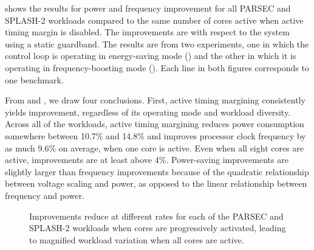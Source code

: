  shows the results for power and frequency improvement for all PARSEC and SPLASH-2 workloads compared to the same number of cores active when active timing margin is disabled. The improvements are with respect to the system using a static guardband. The results are from two experiments, one in which the control loop is operating in energy-saving mode () and the other in which it is operating in frequency-boosting mode (). Each line in both figures corresponds to one benchmark.

From  and , we draw four conclusions. First, active timing margining consistently yields improvement, regardless of its operating mode and workload diversity. Across all of the workloads, active timing margining reduces power consumption somewhere between 10.7\% and 14.8\% and improves processor clock frequency by as much 9.6\% on average, when one core is active. Even when all eight cores are active, improvements are at least above 4\%. Power-saving improvements are slightly larger than frequency improvements because of the quadratic relationship between voltage scaling and power, as opposed to the linear relationship between frequency and power.

\begin{figure}[t]
\vspace*{-.15in}
\centering
  \caption{Improvements reduce at different rates for each of the PARSEC and SPLASH-2 workloads when cores are progressively activated, leading to magnified workload variation when all cores are active.}
\label{fig:workloadvariation} 
\vspace{-0.2cm}
\end{figure}

